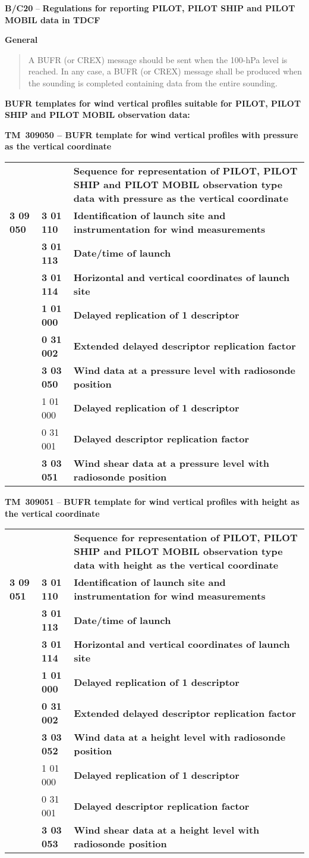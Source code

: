 \textbf{B/C20} -- \textbf{Regulations for reporting PILOT, PILOT SHIP and PILOT MOBIL data in TDCF}

\textbf{General}

\begin{quote}
A BUFR (or CREX) message should be sent when the 100-hPa level is reached. In any case, a BUFR (or CREX) message shall be produced when the sounding is completed containing data from the entire sounding.
\end{quote}

\textbf{BUFR templates for wind vertical profiles suitable for PILOT, PILOT SHIP and PILOT MOBIL observation data:}

\textbf{TM~309050 -- BUFR template for wind vertical profiles with pressure as the vertical coordinate}

\begin{longtable}[]{@{}lll@{}}
\toprule
\endhead
& & \textbf{Sequence for representation of PILOT, PILOT SHIP and PILOT MOBIL observation type data with pressure as the vertical coordinate}\tabularnewline
\textbf{3 09 050} & \textbf{3 01 110} & \textbf{Identification of launch site and instrumentation for wind measurements}\tabularnewline
& \textbf{3 01 113} & \textbf{Date/time of launch}\tabularnewline
& \textbf{3 01 114} & \textbf{Horizontal and vertical coordinates of launch site}\tabularnewline
& \textbf{1 01 000} & \textbf{Delayed replication of 1 descriptor}\tabularnewline
& \textbf{0 31 002} & \textbf{Extended delayed descriptor replication factor}\tabularnewline
& \textbf{3 03 050} & \textbf{Wind data at a pressure level with radiosonde position}\tabularnewline
& 1 01 000 & \textbf{Delayed replication of 1 descriptor}\tabularnewline
& 0 31 001 & \textbf{Delayed descriptor replication factor}\tabularnewline
& \textbf{3 03 051} & \textbf{Wind shear data at a pressure level with radiosonde position}\tabularnewline
\bottomrule
\end{longtable}

\textbf{TM~309051} -- \textbf{BUFR template for wind vertical profiles with height as the vertical coordinate}

\begin{longtable}[]{@{}lll@{}}
\toprule
\endhead
& & \textbf{Sequence for representation of PILOT, PILOT SHIP and PILOT MOBIL observation type data with height as the vertical coordinate}\tabularnewline
\textbf{3 09 051} & \textbf{3 01 110} & \textbf{Identification of launch site and instrumentation for wind measurements}\tabularnewline
& \textbf{3 01 113} & \textbf{Date/time of launch}\tabularnewline
& \textbf{3 01 114} & \textbf{Horizontal and vertical coordinates of launch site}\tabularnewline
& \textbf{1 01 000} & \textbf{Delayed replication of 1 descriptor}\tabularnewline
& \textbf{0 31 002} & \textbf{Extended delayed descriptor replication factor}\tabularnewline
& \textbf{3 03 052} & \textbf{Wind data at a height level with radiosonde position}\tabularnewline
& 1 01 000 & \textbf{Delayed replication of 1 descriptor}\tabularnewline
& 0 31 001 & \textbf{Delayed descriptor replication factor}\tabularnewline
& \textbf{3 03 053} & \textbf{Wind shear data at a height level with radiosonde position}\tabularnewline
\bottomrule
\end{longtable}


